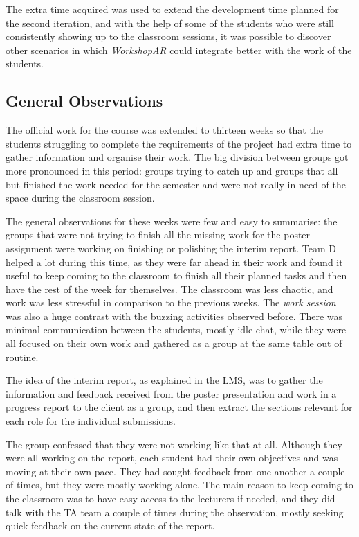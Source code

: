 The extra time acquired was used to extend the development time planned for the second iteration, and with the help of some of the students who were still consistently
showing up to the classroom sessions, it was possible to discover other scenarios in which \emph{WorkshopAR} could integrate better with the work of the students.

\subsection{General Observations \label{sec:6-6-1}}

The official work for the course was extended to thirteen weeks so that the students struggling to complete the requirements of the project had extra time to gather
information and organise their work. The big division between groups got more pronounced in this period: groups trying to catch up and groups that all but finished the
work needed for the semester and were not really in need of the space during the classroom session.

The general observations for these weeks were few and easy to summarise: the groups that were not trying to finish all the missing work for the poster assignment were
working on finishing or polishing the interim report. Team D helped a lot during this time, as they were far ahead in their work and found it useful to keep coming to the
classroom to finish all their planned tasks and then have the rest of the week for themselves. The classroom was less chaotic, and work was less stressful in comparison to
the previous weeks. The \emph{work session} was also a huge contrast with the buzzing activities observed before. There was minimal communication between the students,
mostly idle chat, while they were all focused on their own work and gathered as a group at the same table out of routine.

The idea of the interim report, as explained in the \ac{LMS}, was to gather the information and feedback received from the poster presentation and work in a progress
report to the client as a group, and then extract the sections relevant for each role for the individual submissions.

The group confessed that they were not working like that at all. Although they were all working on the report, each student had their own objectives and was moving at
their own pace. They had sought feedback from one another a couple of times, but they were mostly working alone. The main reason to keep coming to the classroom was to
have easy access to the lecturers if needed, and they did talk with the TA team a couple of times during the observation, mostly seeking quick feedback on the current
state of the report.

